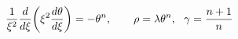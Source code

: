 \documentclass[preview]{standalone}
\begin{document}
\begin{align*}
\special{dvisvgm:raw <g id='unique000'>}\frac{1}{\xi^2}\frac{d}{d\xi}\!\left(\xi^2 \frac{d\theta}{d\xi}\right) = -\theta^n,\qquad \rho = \lambda\theta^n,\ \ \gamma = \frac{n+1}{n}\special{dvisvgm:raw </g>}
\end{align*}
\end{document}
